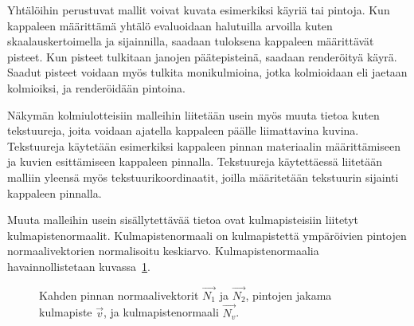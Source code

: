 \documentclass[finnish]{tktltiki2}
\theoremstyle{definition}
\theoremstyle{remark}
\begin{document}
Yhtälöihin perustuvat mallit voivat kuvata esimerkiksi käyriä tai pintoja. Kun kappaleen määrittämä yhtälö evaluoidaan halutuilla arvoilla kuten skaalauskertoimella ja sijainnilla, saadaan tuloksena kappaleen määrittävät pisteet. Kun pisteet tulkitaan janojen päätepisteinä, saadaan renderöityä käyrä. Saadut pisteet voidaan myös tulkita monikulmioina, jotka kolmioidaan eli jaetaan kolmioiksi, ja renderöidään pintoina.

Näkymän kolmiulotteisiin malleihin liitetään usein myös muuta tietoa kuten tekstuureja, joita voidaan ajatella kappaleen päälle liimattavina kuvina. Tekstuureja käytetään esimerkiksi kappaleen pinnan materiaalin määrittämiseen ja kuvien esittämiseen kappaleen pinnalla. Tekstuureja käytettäessä liitetään malliin yleensä myös tekstuurikoordinaatit, joilla määritetään tekstuurin sijainti kappaleen pinnalla.

Muuta malleihin usein sisällytettävää tietoa ovat kulmapisteisiin liitetyt kulmapistenormaalit. Kulmapistenormaali on kulmapistettä ympäröivien pintojen normaalivektorien normalisoitu keskiarvo. Kulmapistenormaalia havainnollistetaan kuvassa~\ref{fig:Kulmapistenormaali}.
\begin{figure}[h]
\centering
{}

\caption{Kahden pinnan normaalivektorit $\vec{N_1}$ ja $\vec{N_2}$, pintojen jakama kulmapiste $\vec{v}$, ja kulmapistenormaali $\vec{N_v}$.}
\label{fig:Kulmapistenormaali}
\end{figure}
\end{document}
